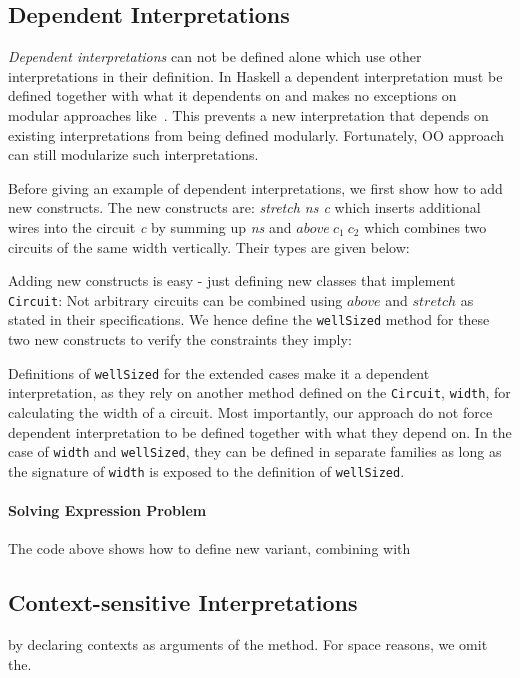 \subsection{Dependent Interpretations}
 \emph{Dependent interpretations} can not be defined alone which use other
 interpretations in their definition.
In Haskell a dependent interpretation must be defined together with what it
dependents on and makes no exceptions on modular approaches like~\cite{}.
This prevents a new interpretation that depends on existing
interpretations from being defined modularly.
Fortunately, OO approach can still modularize such interpretations.

Before giving an example of dependent interpretations, we first show how to add new
constructs. The new constructs are: \emph{stretch ns c} which inserts additional wires into the circuit \emph{c} by
summing up \emph{ns} and $above\ c_1\ c_2$ which combines two circuits of the same width vertically.
Their types are given below:

Adding new constructs is easy - just defining new classes that implement \lstinline{Circuit}:
Not arbitrary circuits can be combined using $above$ and $stretch$
as stated in their specifications.
We hence define the \texttt{wellSized} method for these two new constructs to
verify the constraints they imply:

Definitions of \texttt{wellSized} for the extended cases make it a dependent interpretation, as they
rely on another method defined on the \texttt{Circuit}, \texttt{width}, for calculating the width of a circuit.
Most importantly, our approach do not force dependent interpretation to be
defined together with what they depend on. In the case of \texttt{width} and
\texttt{wellSized}, they can be defined in separate families as long as the
signature of \texttt{width} is exposed to the definition of \texttt{wellSized}.

\paragraph{Solving Expression Problem} The code above shows how to
define new variant, combining with

\subsection{Context-sensitive Interpretations}
by declaring contexts as arguments of the method.
For space reasons, we omit the.